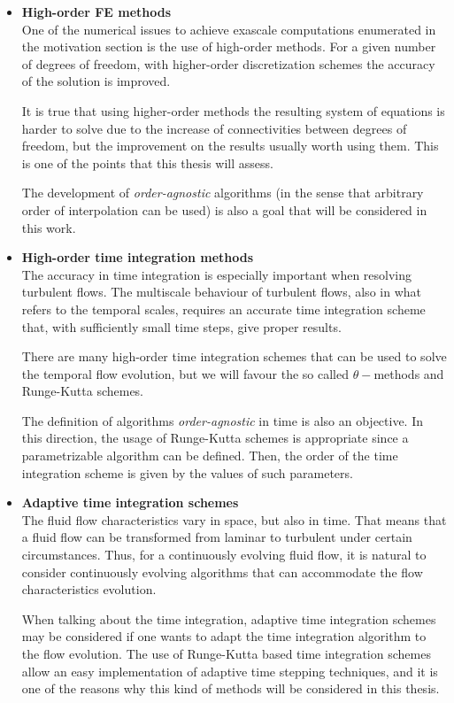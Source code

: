 \begin{itemize}
\item {\bf High-order FE methods}\\
One of the numerical issues to achieve exascale computations enumerated in the motivation section is the use of high-order methods. For a given number of degrees of freedom, with higher-order discretization schemes the accuracy of the solution is improved. 

It is true that using higher-order methods the resulting system of equations is harder to solve due to the increase of connectivities between degrees of freedom, but the improvement on the results usually worth using them. This is one of the points that this thesis will assess.

The development of \textit{order-agnostic} algorithms (in the sense that arbitrary order of interpolation can be used) is also a goal that will be considered in this work.

\item {\bf High-order time integration methods}\\
The accuracy in time integration is especially important when resolving turbulent flows. The multiscale behaviour of turbulent flows, also in what refers to the temporal scales, requires an accurate time integration scheme that, with sufficiently small time steps, give proper results.

There are many high-order time integration schemes that can be used to solve the temporal flow evolution, but we will favour the so called $ \theta- $methods and Runge-Kutta schemes.

The definition of algorithms \textit{order-agnostic} in time is also an objective. In this direction, the usage of Runge-Kutta schemes is appropriate since a parametrizable algorithm can be defined. Then, the order of the time integration scheme is given by the values of such parameters.

\item {\bf Adaptive time integration schemes}\\
The fluid flow characteristics vary in space, but also in time. That means that a fluid flow can be transformed from laminar to turbulent under certain circumstances. Thus, for a continuously evolving fluid flow, it is natural to consider continuously evolving algorithms that can accommodate the flow characteristics evolution. 

When talking about the time integration, adaptive time integration schemes may be considered if one wants to adapt the time integration algorithm to the flow evolution. The use of Runge-Kutta based time integration schemes allow an easy implementation of adaptive time stepping techniques, and it is one of the reasons why this kind of methods will be considered in this thesis.


\end{itemize}

